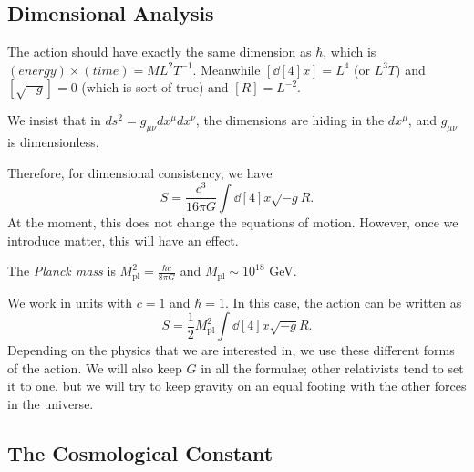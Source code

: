\subsection*{Dimensional Analysis}%

The action should have exactly the same dimension as $\hbar$, which is $(energy) \times (time) = ML^2 T^{-1}$.
Meanwhile $[\dd[4]{x}] = L^4$ (or $L^3 T$) and $[\sqrt{-g}] = 0$ (which is sort-of-true) and $[R] = L^{-2}$. 
\begin{leftbar}
  \begin{remark}
    We insist that in $ds^2 = g_{\mu\nu} dx^{\mu} dx^{\nu}$, the dimensions are hiding in the $dx^{\mu}$, and $g_{\mu\nu}$ is dimensionless.
  \end{remark}
\end{leftbar}
Therefore, for dimensional consistency, we have
\begin{equation}
  S = \frac{c^3}{16 \pi G} \int \dd[4]{x} \sqrt{-g} R.
\end{equation}
At the moment, this does not change the equations of motion. However, once we introduce matter, this will have an effect.

\begin{definition}[]
  The \emph{Planck mass} is $M^2_{\text{pl}} = \frac{\hbar c}{8 \pi G}$ and $M_{\text{pl}} \sim 10^{18}$ GeV. 
\end{definition}
We work in units with $c = 1$ and $\hbar = 1$.
In this case, the action can be written as
\begin{equation}
  S = \frac{1}{2} M^2_{\text{pl}} \int \dd[4]{x} \sqrt{-g} R.
\end{equation}
Depending on the physics that we are interested in, we use these different forms of the action.
We will also keep $G$ in all the formulae; other relativists tend to set it to one, but we will try to keep gravity on an equal footing with the other forces in the universe.

\subsection*{The Cosmological Constant}%

